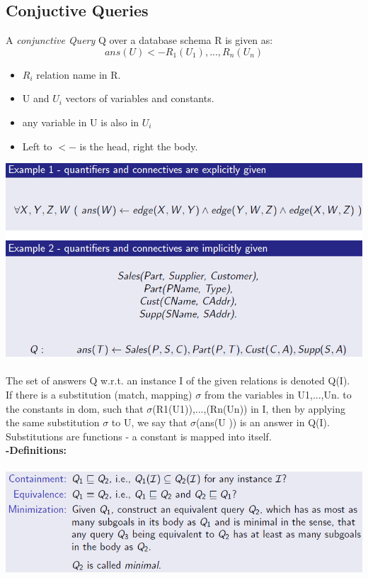 \documentclass{article}
\begin{document}
\subsection{Conjuctive Queries}
A \textit{conjunctive Query }Q over a database schema R is given as:\\
\begin{equation}
ans(U) <- R_1(U_1),...,R_n(U_n)
\end{equation}
\begin{itemize}
\item $R_i$ relation name in R.
\item U and $U_i$ vectors of variables and constants.
\item any variable in U is also in $U_i$
\item Left to $<-$ is the head, right the body.
\end{itemize}
\includegraphics[scale=0.6]{56.png}\\\\
The set of answers Q w.r.t. an instance I of the given relations is denoted Q(I).\\If there is a substitution (match, mapping) $\sigma$ from the variables in U1,...,Un. to the constants in dom, such that $\sigma$(R1(U1)),...,(Rn(Un)) in I, then by applying the same substitution $\sigma$ to U, we say that $\sigma$(ans(U )) is an answer in Q(I).\\
Substitutions are functions - a constant is mapped into itself.\\
\textbf{-Definitions: }\\\\
\includegraphics[scale=0.6]{57.png}\\
\end{document}
